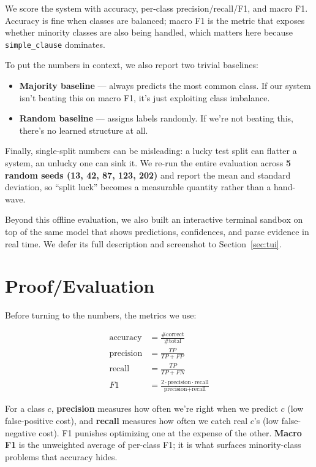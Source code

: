 \documentclass[11pt]{article}
\begin{document}
We score the system with accuracy, per-class precision/recall/F1, and macro F1. Accuracy is fine when classes are balanced; macro F1 is the metric that exposes whether minority classes are also being handled, which matters here because \texttt{simple\_clause} dominates.

To put the numbers in context, we also report two trivial baselines:
\begin{itemize}
    \item \textbf{Majority baseline} --- always predicts the most common class. If our system isn't beating this on macro F1, it's just exploiting class imbalance.
    \item \textbf{Random baseline} --- assigns labels randomly. If we're not beating this, there's no learned structure at all.
\end{itemize}

Finally, single-split numbers can be misleading: a lucky test split can flatter a system, an unlucky one can sink it. We re-run the entire evaluation across \textbf{5 random seeds (13, 42, 87, 123, 202)} and report the mean and standard deviation, so ``split luck'' becomes a measurable quantity rather than a hand-wave.

Beyond this offline evaluation, we also built an interactive terminal sandbox on top of the same model that shows predictions, confidences, and parse evidence in real time. We defer its full description and screenshot to Section~\ref{sec:tui}.

\section{Proof/Evaluation}
\label{sec:eval}
Before turning to the numbers, the metrics we use:

\begin{align*}
\text{accuracy} &= \tfrac{\#\text{correct}}{\#\text{total}} \\[2pt]
\text{precision} &= \tfrac{TP}{TP+FP} \\[2pt]
\text{recall} &= \tfrac{TP}{TP+FN} \\[2pt]
F1 &= \tfrac{2 \cdot \text{precision} \cdot \text{recall}}{\text{precision} + \text{recall}}
\end{align*}

For a class $c$, \textbf{precision} measures how often we're right when we predict $c$ (low false-positive cost), and \textbf{recall} measures how often we catch real $c$'s (low false-negative cost). F1 punishes optimizing one at the expense of the other. \textbf{Macro F1} is the unweighted average of per-class F1; it is what surfaces minority-class problems that accuracy hides.
\end{document}
